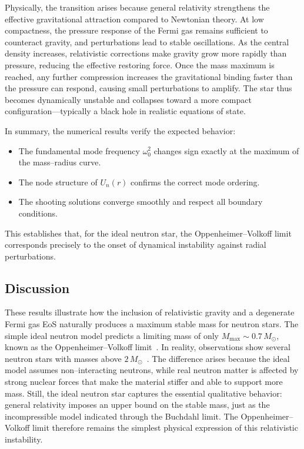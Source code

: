Physically, the transition arises because general relativity
strengthens the effective gravitational attraction compared to
Newtonian theory.
At low compactness, the pressure response of the Fermi gas remains
sufficient to counteract gravity, and perturbations lead to stable
oscillations.
As the central density increases, relativistic corrections make gravity
grow more rapidly than pressure, reducing the effective restoring force.
Once the mass maximum is reached, any further compression increases the
gravitational binding faster than the pressure can respond, causing
small perturbations to amplify.
The star thus becomes dynamically unstable and collapses toward a more
compact configuration—typically a black hole in realistic equations of
state.

In summary, the numerical results verify the expected behavior:
\begin{itemize}
  \item The fundamental mode frequency $\omega_0^2$ changes sign exactly
  at the maximum of the mass--radius curve.
  \item The node structure of $U_n(r)$ confirms the correct mode
  ordering.
  \item The shooting solutions converge smoothly and respect all boundary
  conditions.
\end{itemize}
This establishes that, for the ideal neutron star, the
Oppenheimer--Volkoff limit corresponds precisely to the onset of
dynamical instability against radial perturbations.

\subsection*{Discussion}

These results illustrate how the inclusion of relativistic gravity and a
degenerate Fermi gas EoS naturally produces a maximum stable mass for
neutron stars.  The simple ideal neutron model predicts a limiting mass
of only $M_{\mathrm{max}}\!\sim\!0.7\,M_{\odot}$, known as the
Oppenheimer--Volkoff limit~\cite{oppenheimer1939}.  In reality,
observations show several neutron stars with masses above
$2\,M_{\odot}$~\cite{linares2018,strader2019,linares2020,romani2022}.
The difference arises because the ideal model assumes non--interacting
neutrons, while real neutron matter is affected by strong nuclear forces
that make the material stiffer and able to support more mass.  Still,
the ideal neutron star captures the essential qualitative behavior:
general relativity imposes an upper bound on the stable mass, just as
the incompressible model indicated through the Buchdahl limit.  The
Oppenheimer--Volkoff limit therefore remains the simplest physical
expression of this relativistic instability.
